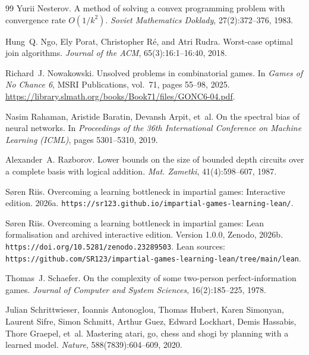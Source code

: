 \documentclass[twoside,11pt]{article}
\numberwithin{theorem}{section}
\numberwithin{equation}{section}
\begin{document}
\begin{thebibliography}{99}
Yurii Nesterov.
\newblock A method of solving a convex programming problem with convergence rate $O(1/k^2)$.
\newblock \emph{Soviet Mathematics Doklady}, 27(2):372--376, 1983.

Hung~Q. Ngo, Ely Porat, Christopher R{\'e}, and Atri Rudra.
\newblock Worst-case optimal join algorithms.
\newblock \emph{Journal of the ACM}, 65(3):16:1--16:40, 2018.

Richard~J. Nowakowski.
\newblock Unsolved problems in combinatorial games.
\newblock In \emph{Games of No Chance 6}, MSRI Publications, vol.~71, pages 55--98, 2025.
\newblock \url{https://library.slmath.org/books/Book71/files/GONC6-04.pdf}.



Nasim Rahaman, Aristide Baratin, Devansh Arpit, et~al.
\newblock On the spectral bias of neural networks.
\newblock In \emph{Proceedings of the 36th International Conference on Machine Learning (ICML)}, pages 5301--5310, 2019.

Alexander~A. Razborov.
\newblock Lower bounds on the size of bounded depth circuits over a complete basis with logical addition.
\newblock \emph{Mat. Zametki}, 41(4):598--607, 1987.

S{\o}ren Riis.
\newblock Overcoming a learning bottleneck in impartial games: Interactive edition.
\newblock 2026a.
\newblock \nolinkurl{https://sr123.github.io/impartial-games-learning-lean/}.

S{\o}ren Riis.
\newblock Overcoming a learning bottleneck in impartial games: Lean formalisation and archived interactive edition.
\newblock Version 1.0.0, Zenodo, 2026b.
\newblock \nolinkurl{https://doi.org/10.5281/zenodo.23289503}.
\newblock Lean sources: \nolinkurl{https://github.com/SR123/impartial-games-learning-lean/tree/main/lean}.

Thomas~J. Schaefer.
\newblock On the complexity of some two-person perfect-information games.
\newblock \emph{Journal of Computer and System Sciences}, 16(2):185--225, 1978.

Julian Schrittwieser, Ioannis Antonoglou, Thomas Hubert, Karen Simonyan,
Laurent Sifre, Simon Schmitt, Arthur Guez, Edward Lockhart, Demis Hassabis,
Thore Graepel, et~al.
\newblock Mastering atari, go, chess and shogi by planning with a learned model.
\newblock \emph{Nature}, 588(7839):604--609, 2020.


\end{thebibliography}
\end{document}
